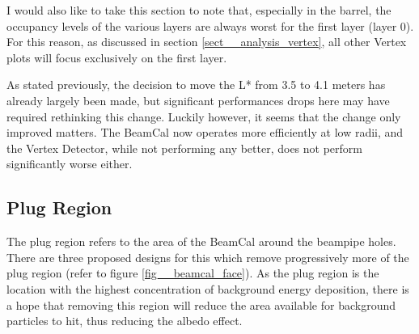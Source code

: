 \documentclass{report}
\begin{document}
                I would also like to take this section to note that, especially in the barrel, the occupancy levels of the various layers are always worst for the first layer (layer 0). For this reason, as discussed in section \ref{sect__analysis_vertex}, all other Vertex plots will focus exclusively on the first layer.

                As stated previously, the decision to move the L* from 3.5 to 4.1 meters has already largely been made, but significant performances drops here may have required rethinking this change. Luckily however, it seems that the change only improved matters. The BeamCal now operates more efficiently at low radii, and the Vertex Detector, while not performing any better, does not perform significantly worse either.


            \subsection{Plug Region}
                The plug region refers to the area of the BeamCal around the beampipe holes. There are three proposed designs for this which remove progressively more of the plug region (refer to figure \ref{fig__beamcal_face}). As the plug region is the location with the highest concentration of background energy deposition, there is a hope that removing this region will reduce the area available for background particles to hit, thus reducing the albedo effect.
\end{document}
